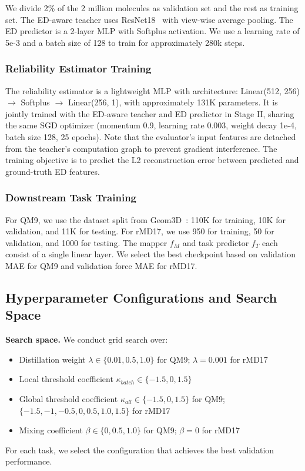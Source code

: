 We divide 2\% of the 2 million molecules as validation set and the rest as training set. The ED-aware teacher uses ResNet18~\cite{he2016deep} with view-wise average pooling. The ED predictor is a 2-layer MLP with Softplus activation. We use a learning rate of 5e-3 and a batch size of 128 to train for approximately 280k steps.

\subsubsection{Reliability Estimator Training}

The reliability estimator is a lightweight MLP with architecture: Linear(512, 256) $\rightarrow$ Softplus $\rightarrow$ Linear(256, 1), with approximately 131K parameters. It is jointly trained with the ED-aware teacher and ED predictor in Stage II, sharing the same SGD optimizer (momentum 0.9, learning rate 0.003, weight decay 1e-4, batch size 128, 25 epochs). Note that the evaluator's input features are detached from the teacher's computation graph to prevent gradient interference. The training objective is to predict the L2 reconstruction error between predicted and ground-truth ED features.

\subsubsection{Downstream Task Training}

For QM9, we use the dataset split from Geom3D~\cite{liu2024symmetry}: 110K for training, 10K for validation, and 11K for testing. For rMD17, we use 950 for training, 50 for validation, and 1000 for testing. The mapper $f_M$ and task predictor $f_T$ each consist of a single linear layer. We select the best checkpoint based on validation MAE for QM9 and validation force MAE for rMD17.


\subsection{Hyperparameter Configurations and Search Space}
\label{sec:appendix_hyperparam}
\label{app:hyper}

\textbf{Search space.} We conduct grid search over:
\begin{itemize}[itemsep=2pt,topsep=2pt]
    \item Distillation weight $\lambda \in \{0.01, 0.5, 1.0\}$ for QM9; $\lambda = 0.001$ for rMD17
    \item Local threshold coefficient $\kappa_{batch} \in \{-1.5, 0, 1.5\}$
    \item Global threshold coefficient $\kappa_{all} \in \{-1.5, 0, 1.5\}$ for QM9; $\{-1.5, -1, -0.5, 0, 0.5, 1.0, 1.5\}$ for rMD17
    \item Mixing coefficient $\beta \in \{0, 0.5, 1.0\}$ for QM9; $\beta = 0$ for rMD17
\end{itemize}
For each task, we select the configuration that achieves the best validation performance.

